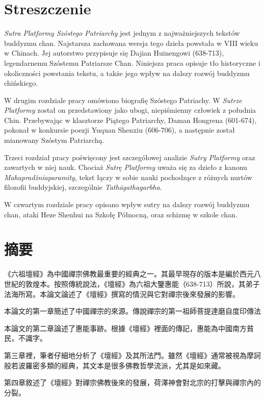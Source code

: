 \makeatletter
\@openrightfalse
\makeatother
\chapter*{Streszczenie}
\textit{Sutra Platformy Szóstego Patriarchy} jest jednym z najważniejszych tekstów buddyzmu chan.
Najstarsza zachowana wersja tego dzieła powstała w VIII wieku w Chinach.
Jej autorstwo przypisuje się Dajian Huinengowi (638-713), legendarnemu Szóstemu Patriarsze Chan.
Niniejsza praca opisuje tło historyczne i okoliczności powstania tekstu, a także jego wpływ na dalszy rozwój buddyzmu chińskiego.

W drugim rozdziale pracy omówiono biografię Szóstego Patriachy.
W \textit{Sutrze Platformy} został on przedstawiony jako ubogi, niepiśmienny człowiek z południa Chin.
Przebywając w klasztorze Piątego Patriarchy, Daman Hongrena (601-674), pokonał w konkursie poezji Yuquan Shenxiu (606-706), a następnie został mianowany Szóstym Patriarchą.

Trzeci rozdział pracy poświęcony jest szczegółowej analizie \textit{Sutry Platformy} oraz zawartych w niej nauk.
Chociaż \textit{Sutrę Platformy} uważa się za dzieło z kanonu \textit{Mahapradżniaparamity}, tekst łączy w sobie nauki pochodzące z różnych nurtów filozofii buddyjskiej, szczególnie \textit{Tathāgathagarbha}.

W czwartym rozdziale pracy opisano wpływ sutry na dalszy rozwój buddyzmu chan, ataki Heze Shenhui na Szkołę Północną, oraz schizmę w szkole chan.

\chapter*{摘要}
《六祖壇經》為中國禪宗佛教最重要的經典之一。其最早現存的版本是編於西元八世紀的敦煌本。按照傳統說法，《壇經》為六祖大鑒惠能（638-713）所說，其弟子法海所寫。本論文論述了《壇經》撰寫的情況與它對禪宗後來發展的影響。

本論文的第一章簡述了中國禪宗的來源。傳說禪宗的第一祖師菩提達磨自度印傳法

本論文的第二章論述了惠能事跡。根據《壇經》裡面的傳記，惠能為中國南方貧民，不識字。

第三章裡，筆者仔細地分析了《壇經》及其所法門。雖然《壇經》通常被視為摩訶般若波羅密多類的經典，其文本是很多佛教哲學流派，尤其是如來藏。

第四章敘述了《壇經》對禪宗佛教後來的發展，荷澤神會對北宗的打擊與禪宗內的分裂。

